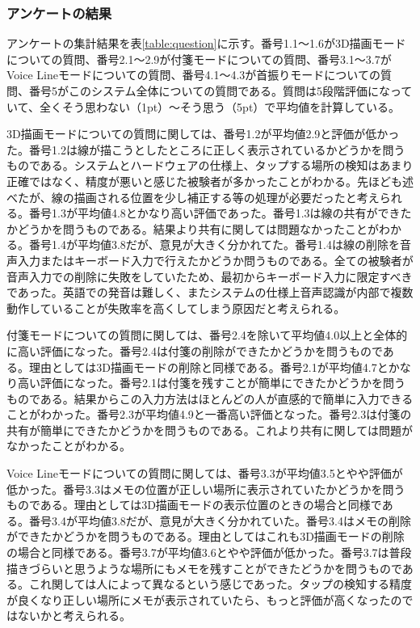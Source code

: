 \documentclass[11pt,a4j, titlepage]{jarticle} %
\begin{document}
\subsubsection{アンケートの結果}
アンケートの集計結果を表\ref{table:question}に示す。番号1.1～1.6が3D描画モードについての質問、番号2.1～2.9が付箋モードについての質問、番号3.1～3.7がVoice Lineモードについての質問、番号4.1～4.3が首振りモードについての質問、番号5がこのシステム全体についての質問である。質問は5段階評価になっていて、全くそう思わない（1pt）～そう思う（5pt）で平均値を計算している。

3D描画モードについての質問に関しては、番号1.2が平均値2.9と評価が低かった。番号1.2は線が描こうとしたところに正しく表示されているかどうかを問うものである。システムとハードウェアの仕様上、タップする場所の検知はあまり正確ではなく、精度が悪いと感じた被験者が多かったことがわかる。先ほども述べたが、線の描画される位置を少し補正する等の処理が必要だったと考えられる。番号1.3が平均値4.8とかなり高い評価であった。番号1.3は線の共有ができたかどうかを問うものである。結果より共有に関しては問題なかったことがわかる。番号1.4が平均値3.8だが、意見が大きく分かれてた。番号1.4は線の削除を音声入力またはキーボード入力で行えたかどうか問うものである。全ての被験者が音声入力での削除に失敗をしていたため、最初からキーボード入力に限定すべきであった。英語での発音は難しく、またシステムの仕様上音声認識が内部で複数動作していることが失敗率を高くしてしまう原因だと考えられる。

付箋モードについての質問に関しては、番号2.4を除いて平均値4.0以上と全体的に高い評価になった。番号2.4は付箋の削除ができたかどうかを問うものである。理由としては3D描画モードの削除と同様である。番号2.1が平均値4.7とかなり高い評価になった。番号2.1は付箋を残すことが簡単にできたかどうかを問うものである。結果からこの入力方法はほとんどの人が直感的で簡単に入力できることがわかった。番号2.3が平均値4.9と一番高い評価となった。番号2.3は付箋の共有が簡単にできたかどうかを問うものである。これより共有に関しては問題がなかったことがわかる。

Voice Lineモードについての質問に関しては、番号3.3が平均値3.5とやや評価が低かった。番号3.3はメモの位置が正しい場所に表示されていたかどうかを問うものである。理由としては3D描画モードの表示位置のときの場合と同様である。番号3.4が平均値3.8だが、意見が大きく分かれていた。番号3.4はメモの削除ができたかどうかを問うものである。理由としてはこれも3D描画モードの削除の場合と同様である。番号3.7が平均値3.6とやや評価が低かった。番号3.7は普段描きづらいと思うような場所にもメモを残すことができたどうかを問うものである。これ関しては人によって異なるという感じであった。タップの検知する精度が良くなり正しい場所にメモが表示されていたら、もっと評価が高くなったのではないかと考えられる。
\end{document}
